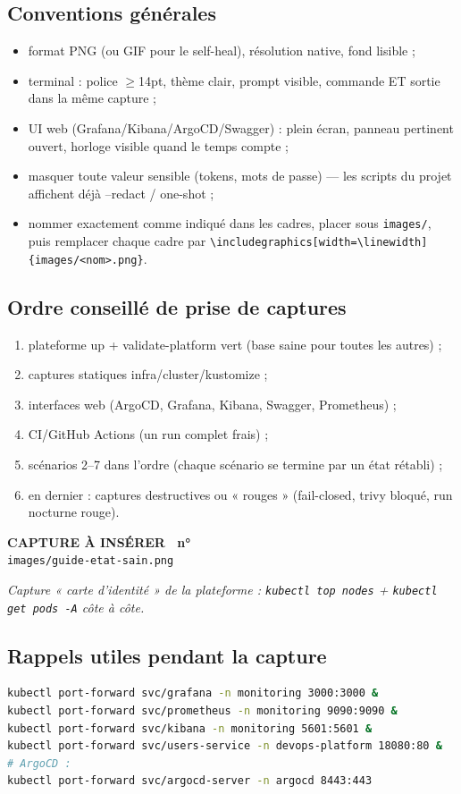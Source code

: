 \documentclass[12pt,a4paper]{article}
\newcounter{capturecount}
\newcommand{\capturebox}[2]{%
\par\vspace{4mm}
\begin{tcolorbox}[enhanced,colback=yellow!5,colframe=black!55,boxrule=0.7pt,
  borderline={0.7pt}{0pt}{black!40,dashed},
  arc=2mm,left=6pt,right=6pt,top=7pt,bottom=7pt]
\centering
{\normalsize\sffamily\bfseries CAPTURE À INSÉRER \textbar\ n°\,\stepcounter{capturecount}\thecapturecount}\\[3pt]
{\large\texttt{images/#2}}\\[7pt]
\begin{minipage}{0.94\linewidth}\centering\itshape #1\end{minipage}
\end{tcolorbox}
\par\vspace{2mm}}
\begin{document}
\subsection*{Conventions générales}
\begin{itemize}[itemsep=1pt]
  \item format PNG (ou GIF pour le self-heal), résolution native, fond lisible ;
  \item terminal : police $\geq$14pt, thème clair, prompt visible, commande ET sortie dans la même capture ;
  \item UI web (Grafana/Kibana/ArgoCD/Swagger) : plein écran, panneau pertinent ouvert, horloge visible quand le temps compte ;
  \item masquer toute valeur sensible (tokens, mots de passe) --- les scripts du projet affichent déjà --redact / one-shot ;
  \item nommer exactement comme indiqué dans les cadres, placer sous \texttt{images/}, puis remplacer chaque cadre par \texttt{\textbackslash includegraphics[width=\textbackslash linewidth]\{images/<nom>.png\}}.
\end{itemize}

\subsection*{Ordre conseillé de prise de captures}
\begin{enumerate}[itemsep=1pt]
  \item plateforme up + validate-platform vert (base saine pour toutes les autres) ;
  \item captures statiques infra/cluster/kustomize ;
  \item interfaces web (ArgoCD, Grafana, Kibana, Swagger, Prometheus) ;
  \item CI/GitHub Actions (un run complet frais) ;
  \item scénarios 2--7 dans l'ordre (chaque scénario se termine par un état rétabli) ;
  \item en dernier : captures destructives ou « rouges » (fail-closed, trivy bloqué, run nocturne rouge).
\end{enumerate}

\capturebox{Capture « carte d'identité » de la plateforme : \texttt{kubectl top nodes} + \texttt{kubectl get pods -A} côte à côte.}{guide-etat-sain.png}

\subsection*{Rappels utiles pendant la capture}
\begin{lstlisting}[language=bash,caption={Port-forwards typiques pour les UI}]
kubectl port-forward svc/grafana -n monitoring 3000:3000 &
kubectl port-forward svc/prometheus -n monitoring 9090:9090 &
kubectl port-forward svc/kibana -n monitoring 5601:5601 &
kubectl port-forward svc/users-service -n devops-platform 18080:80 &
# ArgoCD :
kubectl port-forward svc/argocd-server -n argocd 8443:443
\end{lstlisting}
\end{document}
